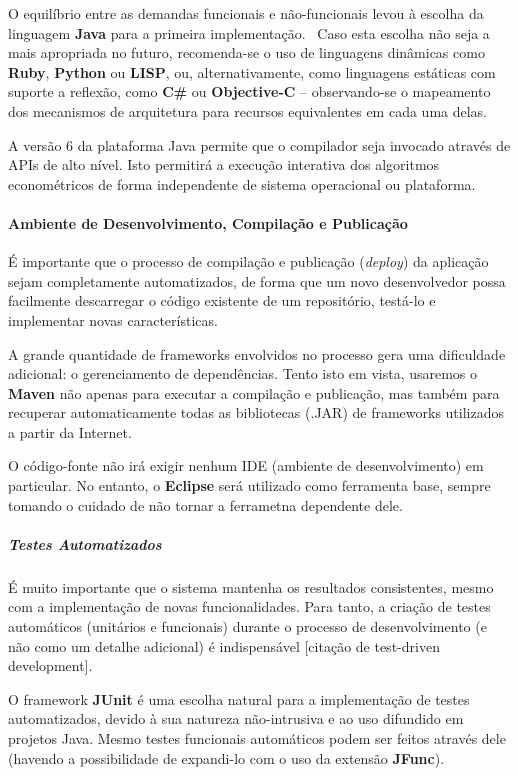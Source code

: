 \documentclass[12pt,twoside]{article}
\begin{document}
O equil\'ibrio entre as demandas funcionais e n\~ao{}-funcionais levou
\`a escolha da linguagem \textbf{Java} para a primeira
implementa\c{c}\~ao. \ Caso esta escolha n\~ao seja a mais apropriada
no futuro, recomenda{}-se o uso de linguagens din\^amicas como
\textbf{Ruby}, \textbf{Python} ou \textbf{LISP}, ou, alternativamente,
como linguagens est\'aticas com suporte a reflex\~ao, como \textbf{C\#}
ou \textbf{Objective{}-C} {--} observando{}-se o mapeamento dos
mecanismos de arquitetura para recursos equivalentes em cada uma delas.

A vers\~ao 6 da plataforma Java permite que o compilador seja invocado
atrav\'es de APIs de alto n\'ivel. Isto permitir\'a a execu\c{c}\~ao
interativa dos algoritmos econom\'etricos de forma independente de
sistema operacional ou plataforma.

\paragraph{Ambiente de Desenvolvimento, Compila\c{c}\~ao e
Publica\c{c}\~ao}
\'E importante que o processo de compila\c{c}\~ao e publica\c{c}\~ao
(\textit{deploy}) da aplica\c{c}\~ao sejam completamente automatizados,
de forma que um novo desenvolvedor possa facilmente descarregar o
c\'odigo existente de um reposit\'orio, test\'a{}-lo e implementar
novas caracter\'isticas.

A grande quantidade de frameworks envolvidos no processo gera uma
dificuldade adicional: o gerenciamento de depend\^encias. Tento isto em
vista, usaremos o \textbf{Maven}\textmd{ n\~ao apenas para executar a
compila\c{c}\~ao e publica\c{c}\~ao, mas tamb\'em para recuperar
automaticamente todas as bibliotecas (.JAR) de frameworks utilizados a
partir da Internet.}

O c\'odigo{}-fonte n\~ao ir\'a exigir nenhum IDE (ambiente de
desenvolvimento) em particular. No entanto, o \textbf{Eclipse} ser\'a
utilizado como ferramenta base, sempre tomando o cuidado de n\~ao
tornar a ferrametna dependente dele. 

\subparagraph{Testes Automatizados}
\'E muito importante que o sistema mantenha os resultados consistentes,
mesmo com a implementa\c{c}\~ao de novas funcionalidades. Para tanto, a
cria\c{c}\~ao de testes autom\'aticos (unit\'arios e funcionais)
durante o processo de desenvolvimento (e n\~ao como um detalhe
adicional) \'e indispens\'avel [cita\c{c}\~ao de test{}-driven
development].

O framework \textbf{JUnit} \'e uma escolha natural para a
implementa\c{c}\~ao de testes automatizados, devido \`a sua natureza
n\~ao{}-intrusiva e ao uso difundido em projetos Java. Mesmo testes
funcionais autom\'aticos podem ser feitos atrav\'es dele (havendo a
possibilidade de expandi{}-lo com o uso da extens\~ao \textbf{JFunc}).
\end{document}
